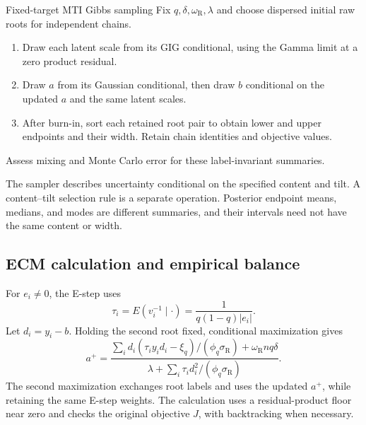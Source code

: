 \par\noindent\begin{minipage}{\textwidth}
\begin{algorithmblock}{Fixed-target MTI Gibbs sampling}
\label{alg:ch05-mti-gibbs}
Fix \(q,\delta,\omega_{\mathrm R},\lambda\) and choose dispersed initial
raw roots for independent chains.
\begin{enumerate}
\item Draw each latent scale from its GIG conditional, using the Gamma limit
at a zero product residual.
\item Draw \(a\) from its Gaussian conditional, then draw \(b\) conditional
on the updated \(a\) and the same latent scales.
\item After burn-in, sort each retained root pair to obtain lower and upper
endpoints and their width. Retain chain identities and objective values.
\end{enumerate}
Assess mixing and Monte Carlo error for these label-invariant summaries.
\end{algorithmblock}
\end{minipage}\par

The sampler describes uncertainty conditional on the specified content and
tilt. A content--tilt selection rule is a separate operation. Posterior
endpoint means, medians, and modes are different summaries, and their
intervals need not have the same content or width.

\subsection{ECM calculation and empirical balance}

For \(e_i\ne0\), the E-step uses
\[
\tau_i=E(v_i^{-1}\mid\cdot)=\frac{1}{q(1-q)|e_i|}.
\]
Let \(d_i=y_i-b\). Holding the second root fixed, conditional maximization
gives
\[
a^+=\frac{\sum_i d_i(\tau_i y_i d_i-\xi_q)/
 (\phi_q\sigma_{\mathrm R})+\omega_{\mathrm R}nq\delta}
 {\lambda+\sum_i\tau_i d_i^2/(\phi_q\sigma_{\mathrm R})}.
\]
The second maximization exchanges root labels and uses the updated
\(a^+\), while retaining the same E-step weights. The calculation uses a
residual-product floor near zero and checks the original objective \(J\),
with backtracking when necessary.

